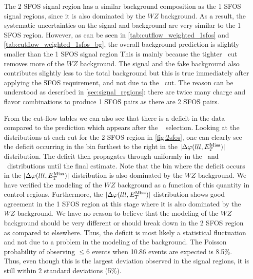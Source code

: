 The 2 SFOS signal region has a similar background composition as
the 1 SFOS signal regions, since it is also dominated by 
the $WZ$ background.  As a result, the systematic uncertainties
on the signal and background are very similar to the 1 SFOS region.
However, 
as can be seen
in
\tab\ref{tab:cutflow_weighted_1sfos}
and 
\tab\ref{tab:cutflow_weighted_1sfos_bg},
the overall background prediction
is slightly smaller than the 1 SFOS signal region 
This is 
mainly because the tighter \MET~cut removes more of the $WZ$ background.
The signal and the 
fake background also contributes slightly less to the total
background but this is true
immediately after applying the SFOS requirement, and not
due to the \MET~cut.
The reason can be understood 
as described in \sec\ref{sec:signal_regions}:
there are twice many charge and flavor combinations to produce
1 SFOS pairs as there are 2 SFOS pairs.


From the cut-flow tables we can also see that there is a deficit in the data
compared to the prediction which appears after the \deltaphi~
selection. Looking at the distributions at each cut for 
the 2 SFOS region in \fig\ref{fig:2sfos},
one can clearly see the deficit occurring in the bin
furthest to the right in the $|\Delta\varphi(lll,E_{T}^{\textrm{Miss}})|$ distribution.
The deficit then propagates through uniformly in the 
\njet~and \nmu~distributions until the final estimate.
Note that the bin where the deficit occurs in the $|\Delta\varphi(lll,E_{T}^{\textrm{Miss}})|$
distribution is also dominated by the $WZ$ background.
We have verified the modeling of the $WZ$ background
as a function of this quantity in control regions. 
Furthermore, the $|\Delta\varphi(lll,E_{T}^{\textrm{Miss}})|$ distribution
shows good agreement in the 1 SFOS region at this stage
where it is also dominated by the $WZ$ background.
We have no reason to believe that the modeling of the $WZ$
background should be very different or should 
break down in the 2 SFOS region as compared to elsewhere.
Thus, the deficit is most likely a statistical fluctuation
and not due to a problem in the modeling of the 
background.
The Poisson probability of observing $\leq 6$ events
when 10.86 events are expected is 8.5\%.
Thus, even though this is the largest deviation observed in the signal
regions, it is still within 2 standard deviations (5\%).


